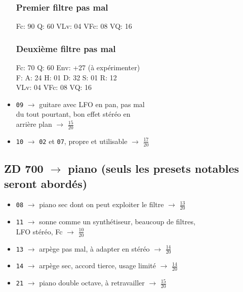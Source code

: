 \documentclass[a4paper, 13pt]{article}
\begin{document}
\begin{itemize}
        \subsubsection{Premier filtre pas mal}
        \textsf{Fc: 90  Q: 60   VLv: 04   VFc: 08   VQ: 16}
        \subsubsection{Deuxième filtre pas mal}
        \textsf{Fc: 70  Q: 60   Env: +27 (à expérimenter) \\ F: A: 24   H: 01   D: 32   S: 01   R: 12 \\  VLv: 04   VFc: 08   VQ: 16}
    \item \texttt{09} $\rightarrow$ guitare avec LFO en pan, pas mal \\du tout pourtant, bon effet stéréo en \\arrière plan $\rightarrow$ \Large{$\frac{15}{20}$} \normalsize \vspace{0.2cm}
    \item \texttt{10} $\rightarrow$ \texttt{02} et \texttt{07}, propre et utilisable $\rightarrow$ \Large{$\frac{17}{20}$} \normalsize \vspace{0.2cm}
\end{itemize}


\vspace{1cm}
\subsection*{ZD 700 $\rightarrow$ piano (seuls les presets notables seront abordés)}
\begin{itemize}
    \item \texttt{08} $\rightarrow$ piano sec dont on peut exploiter le filtre $\rightarrow$ \Large{$\frac{13}{20}$} \normalsize \vspace{0.2cm}
    \item \texttt{11} $\rightarrow$ sonne comme un synthétiseur, beaucoup de filtres, \\LFO stéréo, Fc  $\rightarrow$ \Large{$\frac{10}{20}$} \normalsize \vspace{0.2cm}
    \item \texttt{13} $\rightarrow$ arpège pas mal, à adapter en stéréo $\rightarrow$ \Large{$\frac{14}{20}$} \normalsize \vspace{0.2cm}
    \item \texttt{14} $\rightarrow$ arpège sec, accord tierce, usage limité $\rightarrow$ \Large{$\frac{14}{20}$} \normalsize \vspace{0.2cm}
    \item \texttt{21} $\rightarrow$ piano double octave, à retravailler $\rightarrow$ \Large{$\frac{15}{20}$} \normalsize \vspace{0.2cm}
\end{itemize}
\end{document}
